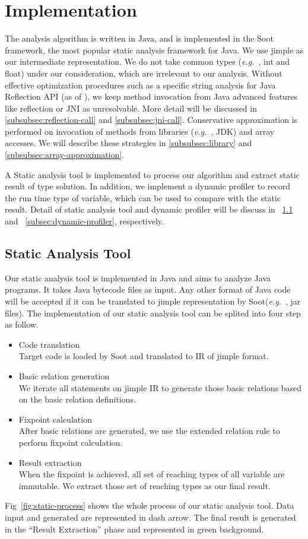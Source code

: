 \documentclass{fac}
\newcommand\eg{\textit{e.g.\ }}
\begin{document}
\section{Implementation}\label{sec:implementation}
The analysis algorithm is written in Java, and is implemented in the Soot framework, the most popular static analysis framework for Java. We use jimple as our intermediate representation.
We do not take common types (\eg, int and float) under our consideration, which are irrelevant to our analysis. Without effective optimization procedures such as a specific string analysis for Java Reflection API (as of ), we keep method invocation from Java advanced features like reflection or JNI as unresolvable. More detail will be discussed in \ref{subsubsec:reflection-call} and \ref{subsubsec:jni-call}. Conservative approximation is performed on invocation of methods from libraries (\eg, JDK) and array accesses. We will describe these strategies in \ref{subsubsec:library} and \ref{subsubsec:array-approximation}.

A Static analysis tool is implemented to process our algorithm and extract static result of type solution. In addition, we implement a dynamic profiler to record the run time type of variable, which can be used to compare with the static result. Detail of static analysis tool and dynamic profiler will be discuss in ~\ref{subsec:static-analysis-tool} and ~\ref{subsec:dynamic-profiler}, respectively.

\subsection{Static Analysis Tool}\label{subsec:static-analysis-tool}
Our static analysis tool is implemented in Java and aims to analyze Java programs. It takes Java bytecode files as input. Any other format of Java code will be accepted if it can be translated to jimple representation by Soot(\eg, jar files). The implementation of our static analysis tool can be splited into four step as follow.
\begin{itemize}
\item Code translation\\
Target code is loaded by Soot and translated to IR of jimple format.
\item Basic relation generation\\
We iterate all statements on jimple IR to generate those basic relations based on the basic relation definitions.
\item Fixpoint calculation\\
After basic relations are generated, we use the extended relation rule to perform fixpoint calculation.
\item Result extraction\\
When the fixpoint is achieved, all set of reaching types of all variable are immutable. We extract those set of reaching types as our final result.
\end{itemize}
Fig~\ref{fig:static-process} shows the whole process of our static analysis tool. Data input and generated are represented in dash arrow. The final result is generated in the ``Result Extraction'' phase and represented in green background.
\end{document}
